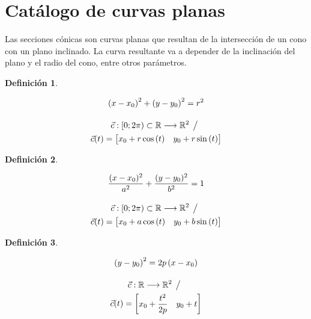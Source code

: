 \documentclass[a5paper,12pt,twoside]{book}
\newtheorem{defn}{{Definición}}[chapter]
\begin{document}
\section{Catálogo de curvas planas}


Las secciones cónicas son curvas planas que resultan de la intersección de un cono con un plano inclinado.
La curva resultante va a depender de la inclinación del plano y el radio del cono, entre otros parámetros.

\begin{mdframed}[style=DefinitionFrame]
    \begin{defn}
    \end{defn}
    \begin{gather*}
        \left(x-x_0\right)^2 + \left(y-y_0\right)^2 = r^2
        \\[1em]
        \Vec{c}:[0;2 \pi) \subset \mathbb{R} \longrightarrow \mathbb{R}^2 \hspace{1ex} \big/ \hspace{1ex}
        \\
        \Vec{c}(t)= \begin{bmatrix} x_0 + r \cos{(t)} & y_0 + r \sin{(t)} \end{bmatrix}
    \end{gather*}
\end{mdframed}

\begin{mdframed}[style=DefinitionFrame]
    \begin{defn}
    \end{defn}
    \begin{gather*}
        \frac{(x-x_0)^2}{a^2}+\dfrac{(y-y_0)^2}{b^2}=1
        \\[1em]
        \Vec{c}:[0;2 \pi) \subset \mathbb{R} \longrightarrow \mathbb{R}^2 \hspace{1ex} \big/ \hspace{1ex}
        \\
        \Vec{c}(t)= \begin{bmatrix} x_0 + a\cos{(t)} & y_0 + b\sin{(t)} \end{bmatrix}
    \end{gather*}
\end{mdframed}

\begin{mdframed}[style=DefinitionFrame]
    \begin{defn}
    \end{defn}
    \begin{gather*}
        \left(y-y_0\right)^2 = 2p\left(x-x_0\right)
        \\[1em]
        \Vec{c}:\mathbb{R} \longrightarrow \mathbb{R}^2 \hspace{1ex} \big/ \hspace{1ex}
        \\
        \Vec{c}(t) = \begin{bmatrix} x_0 + \dfrac{t^2}{2p} & y_0 + t \end{bmatrix}
    \end{gather*}
\end{mdframed}
\end{document}
